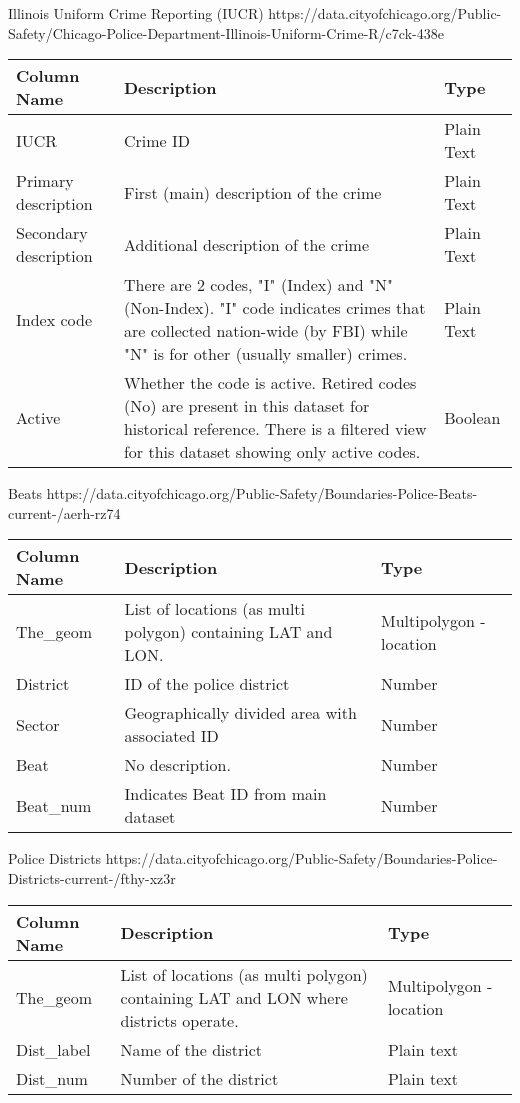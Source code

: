 Illinois Uniform Crime Reporting (IUCR) \newline
https://data.cityofchicago.org/Public-Safety/Chicago-Police-Department-Illinois-Uniform-Crime-R/c7ck-438e
\begin{longtable}{|m{6em}|m{18em}|m{7em}|}
    \hline
    Column Name & 
    Description & 
    Type\\
    \hline
    IUCR & 
    Crime ID & 
    Plain Text\\
    \hline
    Primary description & 
    First (main) description of the crime & 
    Plain Text\\
    \hline
    Secondary description & 
    Additional description of the crime & 
    Plain Text\\
    \hline
    Index code & 
    There are 2 codes, "I" (Index) and "N" (Non-Index). "I" code indicates crimes that are collected nation-wide (by FBI) while "N" is for other (usually smaller) crimes. & 
    Plain Text\\
    \hline
    Active & 
    Whether the code is active. Retired codes (No) are present in this dataset for historical reference. There is a filtered view for this dataset showing only active codes. & 
    Boolean\\
    \hline
\end{longtable}

Beats \newline
https://data.cityofchicago.org/Public-Safety/Boundaries-Police-Beats-current-/aerh-rz74
\begin{longtable}{|m{6em}|m{18em}|m{7em}|}
    \hline
    Column Name & 
    Description & 
    Type\\
    \hline
    The\_geom & 
    List of locations (as multi polygon) containing LAT and LON. & 
    Multipolygon - location\\
    \hline
    District & 
    ID of the police district & 
    Number\\
    \hline
    Sector & 
    Geographically divided area with associated ID & 
    Number\\
    \hline
    Beat & 
    No description. & 
    Number\\
    \hline
    Beat\_num & 
    Indicates Beat ID from main dataset &
    Number\\
    \hline
\end{longtable}

Police Districts \newline
https://data.cityofchicago.org/Public-Safety/Boundaries-Police-Districts-current-/fthy-xz3r
\begin{longtable}{|m{6em}|m{18em}|m{7em}|}
    \hline
    Column Name & 
    Description & 
    Type\\
    \hline
    The\_geom & 
    List of locations (as multi polygon) containing LAT and LON where districts operate.  & 
    Multipolygon - location\\
    \hline
    Dist\_label & 
    Name of the district & 
    Plain text\\
    \hline
    Dist\_num & 
    Number of the district & 
    Plain text\\
    \hline
\end{longtable}

